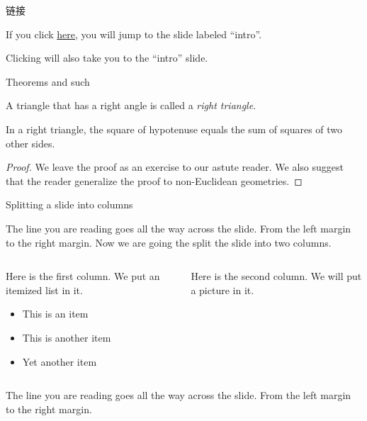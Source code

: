 \documentclass[t]{beamer}
\begin{document}
	\begin{frame}{链接 }

		If you click \hyperlink{intro}{here}, you will jump to the slide
		labeled ``intro''.

		\bigskip

		Clicking \hyperlink{intro}{} will also
		take you to the ``intro'' slide.
	\end{frame}

	\begin{frame}{Theorems and such}
		\begin{definition}
			A triangle that has a right angle is called
			a \emph{right triangle}.
		\end{definition}
		\begin{theorem}
			In a right triangle, the square of hypotenuse equals
			the sum of squares of two other sides.
		\end{theorem}

		\begin{proof}
			We leave the proof as an exercise to our astute reader.
			We also suggest that the reader generalize the proof to
			non-Euclidean geometries.
		\end{proof}
	\end{frame}

	\begin{frame}{Splitting a slide into columns}

		The line you are reading goes all the way across the slide.
		From the left margin to the right margin.  Now we are going
		the split the slide into two columns.
		\bigskip

		\begin{columns}
			\begin{column}{0.5\textwidth}
				Here is the first column.  We put an itemized list in it.
				\begin{itemize}
					\item This is an item
					\item This is another item
					\item Yet another item
				\end{itemize}
			\end{column}

			\begin{column}{0.3\textwidth}
				Here is the second column.  We will put a picture in it.
				\end{column}
			\end{columns}
			\bigskip

			The line you are reading goes all the way across the slide.
			From the left margin to the right margin.

		\end{frame}
\end{document}
